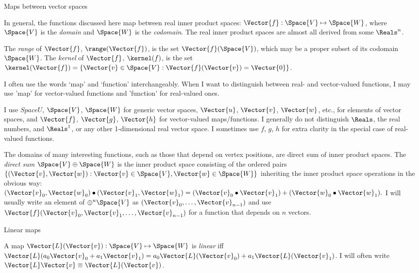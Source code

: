 \begin{plSection}{Maps between vector spaces}
\label{sec:maps}

In general, the functions discussed here map 
between real inner product spaces:
$\Vector{f}:\Space{V} \mapsto \Space{W}$, where $\Space{V}$ is the
{\it domain} and $\Space{W}$ is the {\it codomain}.
The real inner product spaces are almost all 
derived from some $\Reals^n$.

The {\it range} of $\Vector{f}$, $\range(\Vector{f})$, is the set 
$\Vector{f}(\Space{V})$,
which may be a proper subset of its codomain $\Space{W}$.
The {\it kernel} of $\Vector{f}$, $\kernel(f)$, is the set
$\kernel(\Vector{f}) = \{ \Vector{v} \in \Space{V} : 
\Vector{f}(\Vector{v}) = \Vector{0} \}$.

I often use the words `map' and `function' interchangeably.
When I want to distinguish between real- and vector-valued functions,
I may use 'map' for vector-valued functions and
'function' for real-valued ones.

I use $Space{U}$, $\Space{V}$, $\Space{W}$ for generic vector spaces,
$\Vector{u}$, $\Vector{v}$, $\Vector{w}$, etc., for elements of vector spaces,
and
$\Vector{f}$, $\Vector{g}$, $\Vector{h}$ for vector-valued maps/functions.
I generally do not distinguish $\Reals$, the real numbers,
and $\Reals^1$, or any other 1-dimensional real vector space.
I sometimes use $f$, $g$, $h$ for extra clarity in the special
case of real-valued functions.

The domains of many interesting functions,
such as those that depend on vertex positions,
are direct sum of inner product spaces.
The {\it direct sum} $\Space{V} \oplus \Space{W}$ is 
the inner product space
consisting of the ordered pairs $\{ (\Vector{v},\Vector{w}) : 
\Vector{v} \in \Space{V}, \Vector{w} \in \Space{W} \}$
inheriting the inner product space operations in the obvious way:
$(\Vector{v}_0,\Vector{w}_0) \bullet (\Vector{v}_1,\Vector{w}_1) = 
(\Vector{v}_0 \bullet \Vector{v}_1) + (\Vector{w}_0 \bullet \Vector{w}_1).$
I will usually write an element of $\oplus^n \Space{V}$ as
$(\Vector{v}_0,\ldots,\Vector{v}_{n-1})$
and use
$\Vector{f}(\Vector{v}_0,\Vector{v}_1,\ldots,\Vector{v}_{n-1})$
for a function that depends on $n$ vectors.

\begin{plSection}{Linear maps}
\label{sec:linear-maps}

A map $\Vector{L}(\Vector{v}):\Space{V} \mapsto \Space{W}$
is {\it linear} iff
$\Vector{L}(a_0 \Vector{v}_0 + a_1 \Vector{v}_1) = a_0 \Vector{L}(\Vector{v}_0) + a_1 \Vector{L}(\Vector{v}_1)$.
I will often write $\Vector{L}\Vector{v} \equiv \Vector{L}(\Vector{v})$.


\end{plSection}
\end{plSection}
